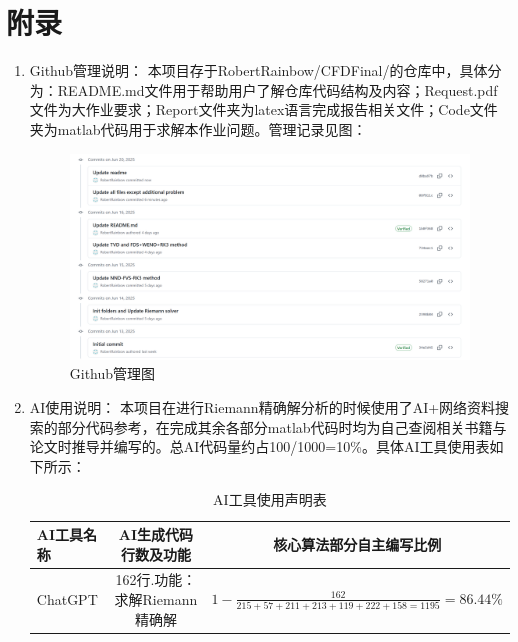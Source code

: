 \documentclass[12pt,a4paper]{article}%
\begin{document}
		
	\section{附录}
		\begin{enumerate}
			\item Github管理说明：
			本项目存于RobertRainbow/CFDFinal/的仓库中，具体分为：README.md文件用于帮助用户了解仓库代码结构及内容；Request.pdf文件为大作业要求；Report文件夹为latex语言完成报告相关文件；Code文件夹为matlab代码用于求解本作业问题。管理记录见图：
			\begin{figure}[H]
				\centering
				\begin{minipage}{0.83\textwidth}
					\centering
					\includegraphics[width=\textwidth]{./fig/git.png}
					\caption{\fontsize{10pt}{15pt}\selectfont Github管理图}
				\end{minipage}
			\end{figure}
			
			\item AI使用说明：
			本项目在进行Riemann精确解分析的时候使用了AI+网络资料搜索的部分代码参考，在完成其余各部分matlab代码时均为自己查阅相关书籍与论文时推导并编写的。总AI代码量约占100/1000=10\%。具体AI工具使用表如下所示：
			\begin{table}[H]
				\centering
				\caption{AI工具使用声明表}
				\begin{tabular}{lcc}
					\toprule
					AI工具名称 & AI生成代码行数及功能 & 核心算法部分自主编写比例  \\
					\midrule
					ChatGPT       &  162行.功能：求解Riemann精确解 &    $1-\frac{162}{215+57+211+213+119+222+158=1195}=86.44\%$  \\
					\bottomrule
				\end{tabular}
			\end{table}
		\end{enumerate}
	
\end{document}
